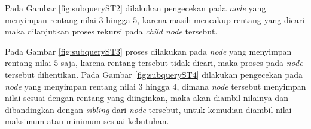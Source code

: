 \quad Pada Gambar \ref{fig:subqueryST2} dilakukan pengecekan pada \textit{node} yang menyimpan rentang nilai $3$ hingga $5$, karena masih mencakup rentang yang dicari maka dilanjutkan proses rekursi pada \textit{child node} tersebut. 

\quad Pada Gambar \ref{fig:subqueryST3} proses dilakukan pada \textit{node} yang menyimpan rentang nilai $5$ saja, karena rentang tersebut tidak dicari, maka proses pada \textit{node} tersebut dihentikan. Pada Gambar \ref{fig:subqueryST4} dilakukan pengecekan pada \textit{node} yang menyimpan rentang nilai $3$ hingga $4$, dimana \textit{node} tersebut menyimpan nilai sesuai dengan rentang yang diinginkan, maka akan diambil nilainya dan dibandingkan dengan \textit{sibling} dari \textit{node} tersebut, untuk kemudian diambil nilai maksimum atau minimum sesuai kebutuhan.

